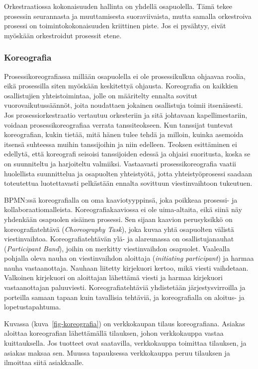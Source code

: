 \documentclass[
  finnish,
  letterpaper,
  DIV=11,
  numbers=noendperiod,
  oneside]{scrreprt}
\begin{document}
Orkestraatiossa kokonaisuuden hallinta on yhdellä osapuolella. Tämä
tekee prosessin seurannasta ja muuttamisesta suoraviivaista, mutta
samalla orkestroiva prosessi on toimintokokonaisuuden kriittinen piste.
Jos ei pysähtyy, eivät myöskään orkestroidut prosessit etene.

\subsubsection{Koreografia}\label{koreografia}

Prosessikoreografiassa millään osapuolella ei ole prosessikulkua
ohjaavaa roolia, eikä prosessilla siten myöskään keskitettyä ohjausta.
Koreografia on kaikkien osallistujien yhteistoimintaa, jolle on
määritelty ennalta sovitut vuorovaikutussäännöt, joita noudattaen
jokainen osallistuja toimii itsenäisesti. Jos prosessiorkestraatio
vertautuu orkesteriin ja sitä johtavaan kapellimestariin, voidaan
prosessikoreografiaa verrata tanssiteokseen. Kun tanssijat tuntevat
koreografian, kukin tietää, mitä hänen tulee tehdä ja milloin, kuinka
asemoida itsensä suhteessa muihin tanssijoihin ja niin edelleen. Teoksen
esittäminen ei edellytä, että koreografi seisoisi tanssijoiden edessä ja
ohjaisi suoritusta, koska se on suunniteltu ja harjoiteltu valmiiksi.
Vastaavasti prosessikoreografia vaatii huolellista suunnittelua ja
osapuolten yhteistyötä, jotta yhteistyöprosessi saadaan toteutettua
luotettavasti pelkästään ennalta sovittuun viestinvaihtoon tukeutuen.

BPMN:ssä koreografialla on oma kaaviotyyppinsä, joka poikkeaa prosessi-
ja kollaboraatiomalleista. Koreografiakaaviossa ei ole uima-altaita,
eikä siinä näy yhdenkään osapuolen sisäinen prosessi. Sen sijaan kaavion
perusyksikkö on koreografiatehtävä (\emph{Choreography Task}), joka
kuvaa yhtä osapuolten välistä viestinvaihtoa. Koreografiatehtävän ylä-
ja alareunassa on osallistujanauhat (\emph{Participant Band}), joihin on
merkitty viestinvaihdon osapuolet. Vaalealla pohjalla oleva nauha on
viestinvaihdon aloittaja (\emph{initiating participant}) ja harmaa nauha
vastaanottaja. Nauhaan liitetty kirjekuori kertoo, mikä viesti
vaihdetaan. Valkoinen kirjekuori on aloittajan lähettämä viesti ja
harmaa kirjekuori vastaanottajan paluuviesti. Koreografiatehtäviä
yhdistetään järjestysvirroilla ja porteilla samaan tapaan kuin
tavallisia tehtäviä, ja koreografialla on aloitus- ja lopetustapahtuma.

Kuvassa (kuva~\ref{fig-koreografia}) on verkkokaupan tilaus
koreografiana. Asiakas aloittaa koreografian lähettämällä tilauksen,
johon verkkokauppa vastaa kuittauksella. Jos tuotteet ovat saatavilla,
verkkokauppa toimittaa tilauksen, ja asiakas maksaa sen. Muussa
tapauksessa verkkokauppa peruu tilauksen ja ilmoittaa siitä asiakkaalle.
\end{document}
